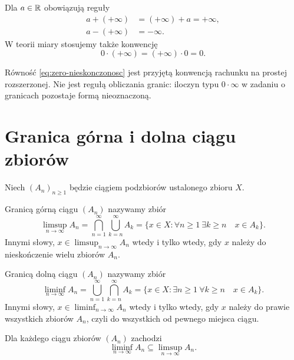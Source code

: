 Dla $a\in\mathbb{R}$ obowiązują reguły
\begin{align*}
  a+(+\infty)&=(+\infty)+a=+\infty,\\
  a-(+\infty)&=-\infty.
\end{align*}
W teorii miary stosujemy także konwencję
\begin{equation}
  0\cdot(+\infty)=(+\infty)\cdot0=0.
  \label{eq:zero-nieskonczonosc}
\end{equation}

\begin{uwaga}
Równość \eqref{eq:zero-nieskonczonosc} jest przyjętą konwencją rachunku
na prostej rozszerzonej. Nie jest regułą obliczania granic: iloczyn typu
$0\cdot\infty$ w zadaniu o granicach pozostaje formą nieoznaczoną.
\end{uwaga}

\section{Granica górna i dolna ciągu zbiorów}
\label{sec:granice-zbiorow}

Niech $(A_n)_{n\geq1}$ będzie ciągiem podzbiorów ustalonego zbioru $X$.

\begin{definicja}
Granicą górną ciągu $(A_n)$ nazywamy zbiór
\begin{equation}
  \limsup_{n\to\infty}A_n
  =\bigcap_{n=1}^{\infty}\bigcup_{k=n}^{\infty}A_k
  =\{x\in X:\forall n\geq1\ \exists k\geq n\quad x\in A_k\}.
  \label{eq:limsup}
\end{equation}
Innymi słowy, $x\in\limsup_{n\to\infty}A_n$ wtedy i tylko wtedy, gdy $x$
należy do nieskończenie wielu zbiorów $A_n$.
\end{definicja}

\begin{definicja}
Granicą dolną ciągu $(A_n)$ nazywamy zbiór
\begin{equation}
  \liminf_{n\to\infty}A_n
  =\bigcup_{n=1}^{\infty}\bigcap_{k=n}^{\infty}A_k
  =\{x\in X:\exists n\geq1\ \forall k\geq n\quad x\in A_k\}.
  \label{eq:liminf}
\end{equation}
Innymi słowy, $x\in\liminf_{n\to\infty}A_n$ wtedy i tylko wtedy, gdy $x$
należy do prawie wszystkich zbiorów $A_n$, czyli do wszystkich od pewnego
miejsca ciągu.
\end{definicja}

\begin{fakt}
Dla każdego ciągu zbiorów $(A_n)$ zachodzi
\begin{equation}
  \liminf_{n\to\infty}A_n\subseteq\limsup_{n\to\infty}A_n.
  \label{eq:inkluzja-granic}
\end{equation}
\end{fakt}

